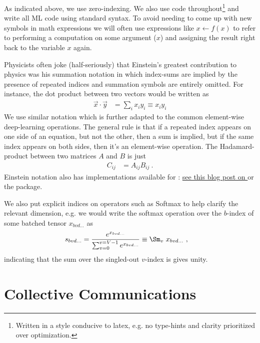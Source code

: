 \documentclass[11pt]{article}
\begin{document}
As indicated above,  we use zero-indexing. We also use  code
throughout\footnote{Written in a style conducive to latex, e.g. no type-hints and clarity
prioritized over optimization.}  and
write all ML code using standard  syntax. To avoid needing to come up with new
symbols in math expressions we will often use expressions like $ x \leftarrow f(x) $ to refer to performing
a computation on some argument ($ x $) and assigning the result right back to the variable $ x $
again.

Physicists often joke (half-seriously) that Einstein's greatest contribution to physics was his
summation notation in which index-sums are implied by the presence of repeated indices and summation
symbols are entirely omitted. For instance, the dot product between two vectors would be written as
\begin{align}
    \vec{x} \cdot \vec{y} &= \sum _{ i } x _{ i } y _{ i } \equiv x _{ i } y _{  i }
    \label{app_eq_einstein_sum}
\end{align}
We use similar notation which is further adapted to the common element-wise deep-learning
operations.  The general rule is that if a repeated index appears on one side of an equation, but
not the other, then a sum is implied, but if the same index appears on both sides, then it's an
element-wise operation. The Hadamard-product between two matrices $ A $ and $ B $ is just
\begin{align}
  C _{ ij } &= A _{ ij } B _{ ij }\ .
\end{align}
Einstein notation also has implementations available for :
\href{https://rockt.github.io/2018/04/30/einsum}{see this blog post on } or the
\href{https://einops.rocks/1-einops-basics/}{} package.

 We also put explicit indices on operators such as Softmax to help clarify the relevant
 dimension, e.g. we would write the softmax operation over the $ b $-index of some batched
 tensor $ x _{ bvd\ldots } $ as
 \begin{align}
     s _{ bvd\ldots } &= \frac{ e^{ x _{ bv d\ldots}  } }{ \sum _{ v = 0 } ^{  v= V-1 } e^{ x _{
     bvd\ldots } } } \equiv
     \Sm _{ v } \ x _{ bvd\ldots }
     \ , \label{app_eq_einstein_softmax}
 \end{align}
 indicating that the sum over the singled-out $ v $-index is gives unity.

\section{Collective Communications \label{app_collective_communications} }
\end{document}
